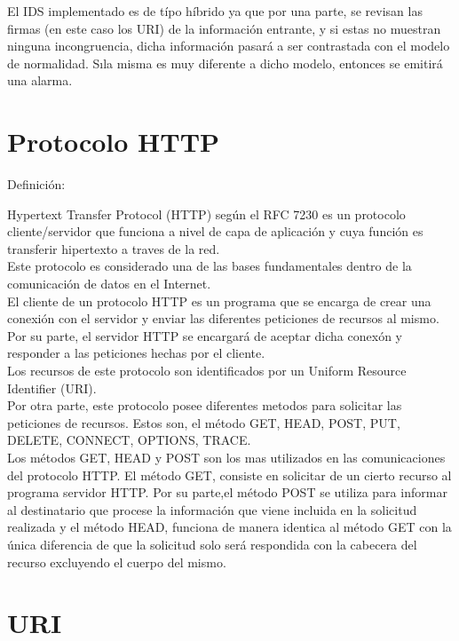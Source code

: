 El IDS implementado es de t\'ipo h\'ibrido ya que por una parte, se revisan las firmas (en este caso los URI) de la informaci\'on entrante, y si estas no muestran ninguna incongruencia, dicha informaci\'on pasar\'a a ser contrastada con el modelo de normalidad. S\i la misma es muy diferente a dicho modelo, entonces se emitir\'a una alarma.

\section{Protocolo HTTP}

Definici\'on:

Hypertext Transfer Protocol (HTTP) seg\'un el RFC 7230 es un protocolo cliente/servidor que funciona a nivel de capa de aplicaci\'on y cuya funci\'on es transferir hipertexto a traves de la red.\\

 Este protocolo es considerado una de las bases fundamentales dentro de la comunicaci\'on de datos en el Internet.\\
 
 El cliente de un protocolo HTTP es un programa que se encarga de crear una conexi\'on con el servidor y enviar las diferentes peticiones de recursos al mismo. Por su parte, el servidor HTTP se encargar\'a de aceptar dicha conex\'on y responder a las peticiones hechas por el cliente.\\
 
Los recursos de este protocolo son identificados por un Uniform Resource Identifier (URI).\\

Por otra parte, este protocolo posee diferentes metodos para solicitar las peticiones de recursos. Estos son, el m\'etodo GET, HEAD, POST, PUT, DELETE, CONNECT, OPTIONS, TRACE. \\

Los m\'etodos GET, HEAD y POST son los mas utilizados en las comunicaciones del protocolo HTTP. El m\'etodo GET, consiste en solicitar de un cierto recurso al programa servidor HTTP. Por su parte,el m\'etodo POST se utiliza para informar al destinatario que procese la informaci\'on que viene incluida en la solicitud realizada y el m\'etodo HEAD, funciona de manera identica al m\'etodo GET con la \'unica diferencia de que la solicitud solo ser\'a respondida con la cabecera del recurso excluyendo el cuerpo del mismo.\\

    
\section{URI} \label{URIsection}


